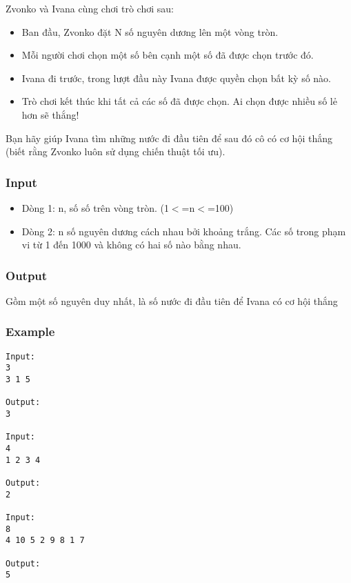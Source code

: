 



   Zvonko và Ivana cùng chơi trò chơi sau:  
\begin{itemize}
	\item     Ban đầu, Zvonko đặt N số nguyên dương lên một vòng tròn.   
	\item     Mỗi người chơi chọn một số bên cạnh một số đã được chọn trước đó.   
	\item     Ivana đi trước, trong lượt đầu này Ivana được quyền chọn bất kỳ số nào.   
	\item     Trò chơi kết thúc khi tất cả các số đã được chọn. Ai chọn được nhiều số lẻ hơn sẽ thắng!   
\end{itemize}

   Bạn hãy giúp Ivana tìm những nước đi đầu tiên để sau đó cô có cơ hội thắng (biết rằng Zvonko luôn sử dụng chiến thuật tối ưu).  

\subsubsection{   Input  }
\begin{itemize}
	\item     Dòng 1: n, số số trên vòng tròn. (1$<$=n$<$=100)   
	\item     Dòng 2: n số nguyên dương cách nhau bởi khoảng trắng. Các số trong phạm vi từ 1 đến 1000 và không có hai số nào bằng nhau.   
\end{itemize}

\subsubsection{   Output  }

   Gồm một số nguyên duy nhất, là số nước đi đầu tiên để Ivana có cơ hội thắng  

\subsubsection{   Example  }
\begin{verbatim}
Input:
3
3 1 5

Output:
3

Input:
4
1 2 3 4

Output:
2

Input:
8
4 10 5 2 9 8 1 7

Output:
5
\end{verbatim}